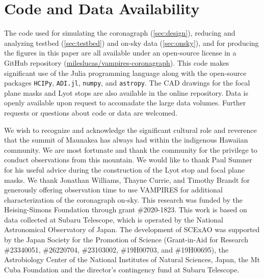\documentclass[]{spie}  %
\begin{document}

\appendix    %


\section{Code and Data Availability}\label{sec:code}

The code used for simulating the coronagraph (\autoref{sec:design}), reducing and analyzing testbed (\autoref{sec:testbed}) and on-sky data (\autoref{sec:onsky}), and for producing the figures in this paper are all available under an open-source license in a GitHub repository (\href{https://github.com/mileslucas/vampires-coronagraph}{mileslucas/vampires-coronagraph}). This code makes significant use of the Julia programming language\cite{bezanson2017} along with the open-source packages \texttt{HCIPy}\cite{por2018}, \texttt{ADI.jl}\cite{lucas2020}, \texttt{numpy}\cite{harris2020}, and \texttt{astropy}\cite{astropycollaboration2013,astropycollaboration2018}. The CAD drawings for the focal plane masks and Lyot stops are also available in the online repository. Data is openly available upon request to accomadate the large data volumes. Further requests or questions about code or data are welcomed.

\acknowledgments

We wish to recognize and acknowledge the significant cultural role and reverence that the summit of Maunakea has always had within the indigenous Hawaiian community. We are most fortunate and thank the community for the privilege to conduct observations from this mountain. We would like to thank Paul Sumner for his useful advice during the construction of the Lyot stop and focal plane masks. We thank Jonathan Williams, Thayne Currie, and Timothy Brandt for generously offering observation time to use VAMPIRES for additional characterization of the coronagraph on-sky. This research was funded by the Heising-Simons Foundation through grant \#2020-1823. This work is based on data collected at Subaru Telescope, which is operated by the National Astronomical Observatory of Japan. The development of SCExAO was supported by the Japan Society for the Promotion of Science (Grant-in-Aid for Research \#23340051, \#26220704, \#23103002, \#19H00703, and \#19H00695), the Astrobiology Center of the National Institutes of Natural Sciences, Japan, the Mt Cuba Foundation and the director's contingency fund at Subaru Telescope. 


\end{document}
